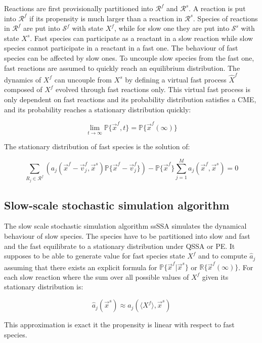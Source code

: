    Reactions are first provisionally partitioned into $\mathcal{R}^f$ and $\mathcal{R}^s$.
    A reaction is put into $\mathcal{R}^f$ if its propensity is much larger than a reaction in $\mathcal{R}^s$.
    Species of reactions in $\mathcal{R}^f$ are put into $\mathcal{S}^f$ with state $X^f$, while for slow one they are put into $\mathcal{S}^s$ with state $X^s$.
    Fast species can participate as a reactant in a slow reaction while slow species cannot participate in a reactant in a fast one.
    The behaviour of fast species can be affected by slow ones.
    To uncouple slow species from the fast one, fast reactions are assumed to quickly reach an equilibrium distribution.
    The dynamics of $X^f$ can uncouple from $X^s$ by defining a virtual fast process $\hat{X}^f$ composed of $X^f$ evolved through fast reactions only.
    This virtual fast process is only dependent on fast reactions and its probability distribution satisfies a CME, and its probability reaches a stationary distribution quickly:

    $$\lim\limits_{t\rightarrow\infty}\mathbb{P}\{\vec{x}^f, t\} = \mathbb{P}\{\vec{x}^f(\infty)\}$$

    The stationary distribution of fast species is the solution of:

    $$\sum\limits_{R_j\in\mathcal{R}^f}(a_j(\vec{x}^f-\vec{v}_j^f, \vec{x}^s)\mathbb{P}\{\vec{x}^f-\vec{v}_j^f\})-\mathbb{P}\{\vec{x}^f\}\sum\limits_{j=1}^Ma_j(\vec{x}^f,\vec{x}^s) = 0$$

  \subsection{Slow-scale stochastic simulation algorithm}
  The slow scale stochastic simulation algorithm ssSSA simulates the dynamical behaviour of slow species.
  The species have to be partitioned into slow and fast and the fast equilibrate to a stationary distribution under QSSA or PE.
  It supposes to be able to generate value for fast species state $X^f$ and to compute $\hat{a}_j$ assuming that there exists an explicit formula for $\mathbb{P}\{\vec{x}^f|\vec{x}^s\}$ or $\mathbb{R}\{\vec{x}^f(\infty)\}$.
  For each slow reaction where the sum over all possible values of $X^f$ given its stationary distribution is:

  $$\hat{a}_j(\vec{x}^s)\approx a_j(\langle X^f\rangle, \vec{x}^s)$$

  This approximation is exact it the propensity is linear with respect to fast species.

